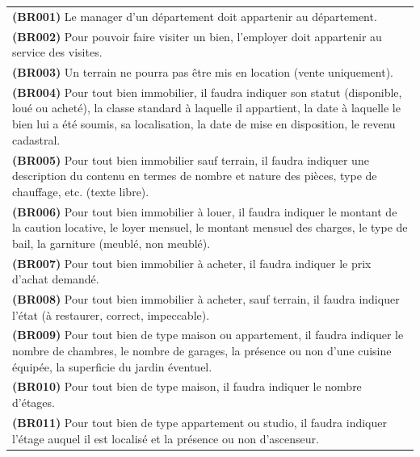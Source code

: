 \begin{table}
  \begin{tabular}{|p{}|}
  \hline
  \rowcolor{gray05} \multicolumn{1}{|c|}{\textbf{Contraintes}} \\
  \hline
  \hline
  \textbf{(BR001)} Le manager d'un département doit appartenir au département. \\
  \textbf{(BR002)} Pour pouvoir faire visiter un bien, l'employer doit appartenir au service des visites. \\
  \textbf{(BR003)} Un terrain ne pourra pas être mis en location (vente uniquement). \\
  \textbf{(BR004)} Pour tout bien immobilier, il faudra indiquer son statut (disponible, loué ou acheté), la classe standard à laquelle il appartient,
la date à laquelle le bien lui a été soumis, sa localisation, la date de mise en disposition, le revenu cadastral. \\
  \textbf{(BR005)} Pour tout bien immobilier sauf terrain, il faudra indiquer une description du contenu en termes de nombre et nature des
pièces, type de chauffage, etc. (texte libre). \\
  \textbf{(BR006)} Pour tout bien immobilier à louer, il faudra indiquer le montant de la caution locative, le loyer mensuel, le montant mensuel
des charges, le type de bail, la \og{}garniture\fg{} (meublé, non meublé). \\
  \textbf{(BR007)} Pour tout bien immobilier à acheter, il faudra indiquer le prix d'achat demandé. \\
  \textbf{(BR008)} Pour tout bien immobilier à acheter, sauf terrain, il faudra indiquer l'état (à restaurer, correct, impeccable). \\
  \textbf{(BR009)} Pour tout bien de type \og{}maison\fg{} ou \og{}appartement\fg{}, il faudra indiquer le nombre de chambres, le nombre de garages, la présence ou non d'une cuisine équipée, la superficie du jardin éventuel. \\
  \textbf{(BR010)} Pour tout bien de type \og{}maison\fg{}, il faudra indiquer le nombre d'étages. \\
  \textbf{(BR011)} Pour tout bien de type \og{}appartement\fg{} ou \og{}studio\fg{}, il faudra indiquer l'étage auquel il est localisé et la présence ou non d'ascenseur. \\

\end{tabular}
\end{table}
